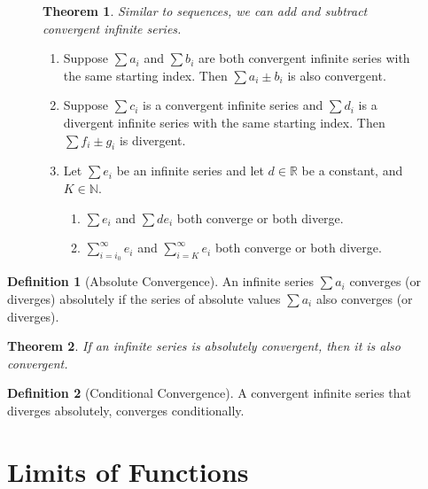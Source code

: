 \documentclass{article}
\newcommand*{\N}{\mathbb{N}}
\newcommand*{\R}{\mathbb{R}}
\theoremstyle{plain}
\newtheorem{theorem}{Theorem}[section]
\numberwithin{theorem}{subsection}
\theoremstyle{definition}
\newtheorem{definition}{Definition}[section]
\numberwithin{definition}{subsection}
\theoremstyle{remark}
\numberwithin{note}{subsection}
\begin{document}
%
\begin{figure}[H]
	\begin{mdframed}[style=exampledefault]
		\begin{theorem}
			Similar to sequences, we can add and subtract convergent infinite series.
		\end{theorem}

		\begin{enumerate}
			\item Suppose $\sum a_i$ and $\sum b_i$ are both convergent infinite series with the same starting index. Then $\sum a_i \pm b_i$ is also convergent.
			\item Suppose $\sum c_i$ is a convergent infinite series and $\sum d_i$ is a divergent infinite series with the same starting index. Then $\sum f_i \pm g_i$ is divergent.
			\item Let $\sum e_i$ be an infinite series and let $d\in\R$ be a constant, and $K\in\N$.
			\begin{enumerate}
				\item $\sum e_i$ and $\sum d e_i$ both converge or both diverge.
				\item $\sum_{i=i_0}^\infty e_i$ and $\sum_{i=K}^\infty e_i$ both converge or both diverge.
			\end{enumerate}
		\end{enumerate}

	\end{mdframed}
\end{figure}
%
\begin{definition}[Absolute Convergence]
	An infinite series $\sum a_i$ converges (or diverges) absolutely if the series of absolute values $\sum a_i$ also converges (or diverges).
\end{definition}
\begin{theorem}
	If an infinite series is absolutely convergent, then it is also convergent.
\end{theorem}
%
\begin{definition}[Conditional Convergence]
	A convergent infinite series that diverges absolutely, converges conditionally.
\end{definition}
\section{Limits of Functions}
\end{document}
